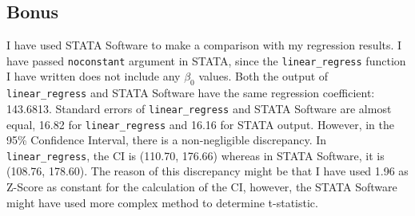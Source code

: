 \documentclass[a4paper]{article}
\begin{document}
\subsection{Bonus}
    I have used STATA Software to make a comparison with my regression results. I have passed \verb|noconstant| argument in STATA, since the \verb|linear_regress| function I have written does not include any $\beta_0$ values. Both the output of \verb|linear_regress| and STATA Software have the same regression coefficient: 143.6813. Standard errors of \verb|linear_regress| and STATA Software are almost equal, 16.82 for \verb|linear_regress| and 16.16 for STATA output. However, in the 95\% Confidence Interval, there is a non-negligible discrepancy. In \verb|linear_regress|, the CI is (110.70, 176.66) whereas in STATA Software, it is (108.76, 178.60). The reason of this discrepancy might be that I have used 1.96 as Z-Score as constant for the calculation of the CI, however, the STATA Software might have used more complex method to determine t-statistic.
\end{document}
